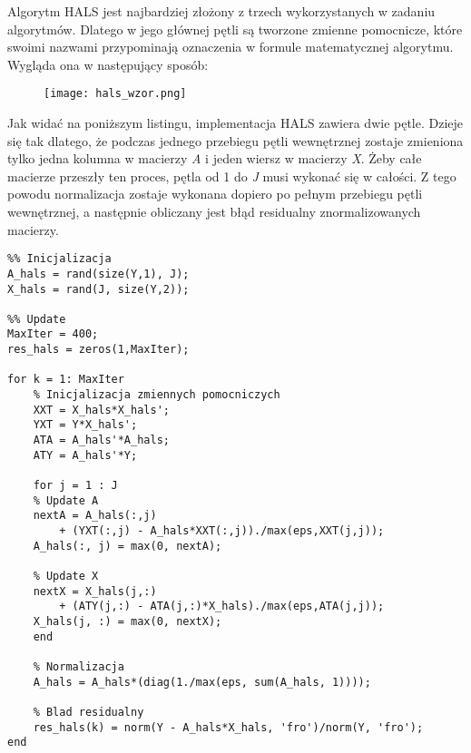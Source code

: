 \newpage

Algorytm HALS jest najbardziej złożony z trzech wykorzystanych w zadaniu algorytmów. Dlatego w jego głównej pętli są tworzone zmienne pomocnicze, które swoimi nazwami przypominają oznaczenia w formule matematycznej algorytmu. Wygląda ona w następujący sposób:

\begin{figure}[H]
	\centering
	\texttt{[image: hals\_wzor.png]} 
	\label{rys:hals_wzor} 
\end{figure}

Jak widać na poniższym listingu, implementacja HALS zawiera dwie pętle. Dzieje się tak dlatego, że podczas jednego przebiegu pętli wewnętrznej zostaje zmieniona tylko jedna kolumna w macierzy \textit{A} i jeden wiersz w macierzy \textit{X}. Żeby całe macierze przeszły ten proces, pętla od 1 do \textit{J} musi wykonać się w całości. Z tego powodu normalizacja zostaje wykonana dopiero po pełnym przebiegu pętli wewnętrznej, a następnie obliczany jest błąd residualny znormalizowanych macierzy.

\vspace{5mm}
\begin{minipage}{\linewidth}
\begin{lstlisting}[linewidth=14.5cm]
%% Algorytm HALS
%% Inicjalizacja
A_hals = rand(size(Y,1), J);
X_hals = rand(J, size(Y,2));

%% Update
MaxIter = 400;
res_hals = zeros(1,MaxIter);

for k = 1: MaxIter
	% Inicjalizacja zmiennych pomocniczych
	XXT = X_hals*X_hals';
	YXT = Y*X_hals';
	ATA = A_hals'*A_hals;
	ATY = A_hals'*Y;
	
	for j = 1 : J
	% Update A       
	nextA = A_hals(:,j) 
		+ (YXT(:,j) - A_hals*XXT(:,j))./max(eps,XXT(j,j));
	A_hals(:, j) = max(0, nextA);  
	
	% Update X
	nextX = X_hals(j,:) 
		+ (ATY(j,:) - ATA(j,:)*X_hals)./max(eps,ATA(j,j));
	X_hals(j, :) = max(0, nextX);       
	end

	% Normalizacja
	A_hals = A_hals*(diag(1./max(eps, sum(A_hals, 1))));
	
	% Blad residualny
	res_hals(k) = norm(Y - A_hals*X_hals, 'fro')/norm(Y, 'fro');
end
\end{lstlisting}
\end{minipage}